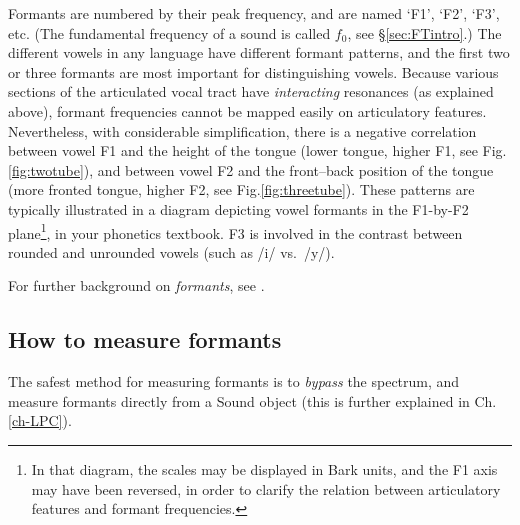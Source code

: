 \documentclass[
]{book}
\begin{document}
Formants are numbered by their peak frequency, and are named `F1', `F2', `F3', etc. (The fundamental frequency of a sound is called \(f_0\), see §\ref{sec:FTintro}.)
The different vowels in any language have different formant patterns, and the first two or three formants are most important for distinguishing vowels. Because various sections of the articulated vocal tract have \emph{interacting} resonances (as explained above), formant frequencies cannot be mapped easily on articulatory features. Nevertheless, with considerable simplification, there is a negative correlation between vowel F1 and the height of the tongue (lower tongue, higher F1, see Fig.\ref{fig:twotube}), and between vowel F2 and the front--back position of the tongue (more fronted tongue, higher F2, see Fig.\ref{fig:threetube}). These patterns are typically illustrated in a diagram depicting vowel formants in the F1-by-F2 plane\footnote{In that diagram, the scales may be displayed in Bark units, and the F1 axis may have been reversed, in order to clarify the relation between articulatory features and formant frequencies.}, in your phonetics textbook. F3 is involved in the contrast between rounded and unrounded vowels (such as /i/ vs.~/y/).

For further background on \emph{formants}, see \citet{Aalto_Malinen_Vainio_2018}.

\protect{}\label{box-praatformants}
\subsection{How to measure formants}\label{sec:measureformants}

The safest method for measuring formants is to \emph{bypass} the spectrum, and measure formants directly from a Sound object (this is further explained in Ch.\ref{ch-LPC}).
\end{document}
